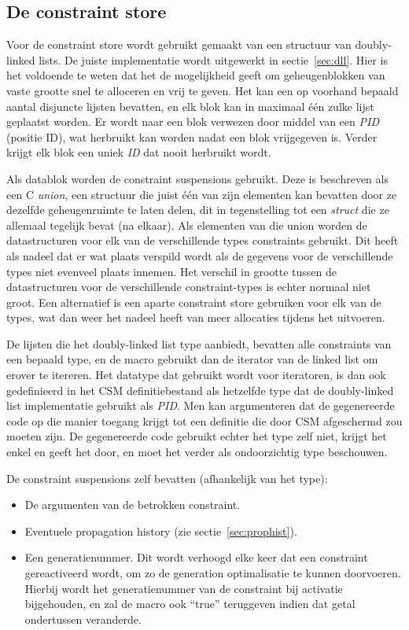 \subsection{De constraint store} \label{sec:constore}

Voor de constraint store wordt gebruikt gemaakt van een structuur van doubly-linked lists. De juiste implementatie wordt uitgewerkt in sectie~\ref{sec:dll}. Hier is het voldoende te weten dat het de mogelijkheid geeft om geheugenblokken van vaste grootte snel te alloceren en vrij te geven. Het kan een op voorhand bepaald aantal disjuncte lijsten bevatten, en elk blok kan in maximaal \'e\'en zulke lijst geplaatst worden. Er wordt naar een blok verwezen door middel van een {\em PID} (positie ID), wat herbruikt kan worden nadat een blok vrijgegeven is. Verder krijgt elk blok een uniek {\em ID} dat nooit herbruikt wordt.

Als datablok worden de constraint suspensions gebruikt. Deze is beschreven als een C {\em union}, een structuur die juist \'e\'en van zijn elementen kan bevatten door ze dezelfde geheugenruimte te laten delen, dit in tegenstelling tot een {\em struct} die ze allemaal tegelijk bevat (na elkaar). Als elementen van die union worden de datastructuren voor elk van de verschillende types constraints gebruikt. Dit heeft als nadeel dat er wat plaats verspild wordt als de gegevens voor de verschillende types niet evenveel plaats innemen. Het verschil in grootte tussen de datastructuren voor de verschillende constraint-types is echter normaal niet groot. Een alternatief is een aparte constraint store gebruiken voor elk van de types, wat dan weer het nadeel heeft van meer allocaties tijdens het uitvoeren.

De lijsten die het doubly-linked list type aanbiedt, bevatten alle constraints van een bepaald type, en de  macro gebruikt dan de iterator van de linked list om erover te itereren. Het  datatype dat gebruikt wordt voor iteratoren, is dan ook gedefinieerd in het CSM definitiebestand als hetzelfde type dat de doubly-linked list implementatie gebruikt als {\em PID}. Men kan argumenteren dat de gegenereerde code op die manier toegang krijgt tot een definitie die door CSM afgeschermd zou moeten zijn. De gegenereerde code gebruikt echter het  type zelf niet, krijgt het enkel en geeft het door, en moet het verder als ondoorzichtig type beschouwen.

De constraint suspensions zelf bevatten (afhankelijk van het type): \begin{itemize}
  \item De argumenten van de betrokken constraint.
  \item Eventuele propagation history (zie sectie~\ref{sec:prophist}).
  \item Een generatienummer. Dit wordt verhoogd elke keer dat een constraint gereactiveerd wordt, om zo de generation optimalisatie te kunnen doorvoeren. Hierbij wordt het generatienummer van de constraint bij activatie bijgehouden, en zal de  macro ook ``true'' teruggeven indien dat getal ondertussen veranderde.
\end{itemize}

